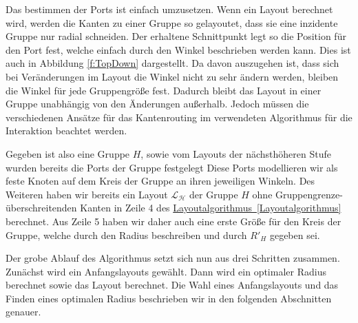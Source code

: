 Das bestimmen der Ports ist einfach umzusetzen. 
Wenn ein Layout berechnet wird, werden die Kanten zu einer Gruppe so gelayoutet, dass sie eine inzidente Gruppe nur radial schneiden.
Der erhaltene Schnittpunkt legt so die Position für den Port fest, welche einfach durch den Winkel beschrieben werden kann. 
Dies ist auch in Abbildung \autoref{f:TopDown} dargestellt.
Da davon auszugehen ist, dass sich bei Veränderungen im Layout die Winkel nicht zu sehr ändern werden, bleiben die Winkel für jede Gruppengröße fest.
Dadurch bleibt das Layout in einer Gruppe unabhängig von den Änderungen außerhalb. 
Jedoch müssen die verschiedenen Ansätze für das Kantenrouting im verwendeten Algorithmus für die Interaktion beachtet werden.



Gegeben ist also eine Gruppe $H$, sowie vom Layouts der nächsthöheren Stufe wurden bereits die Ports der Gruppe festgelegt
Diese Ports modellieren wir als feste Knoten auf dem Kreis der Gruppe an ihren jeweiligen Winkeln.
Des Weiteren haben wir bereits ein Layout $\mathcal{L_H}$ der Gruppe $H$ ohne Gruppengrenze-überschreitenden Kanten in Zeile 4 des \hyperref[Layoutalgorithmus]{Layoutalgorithmus~\ref*{Layoutalgorithmus}}  berechnet. 
Aus Zeile 5 haben wir daher auch eine erste Größe für den Kreis der Gruppe, welche durch den Radius beschreiben und durch $R'_H$ gegeben sei. 

Der grobe Ablauf des Algorithmus setzt sich nun aus drei Schritten zusammen. Zunächst wird ein Anfangslayouts gewählt.
Dann wird ein optimaler Radius  berechnet sowie das Layout berechnet. 
Die Wahl eines Anfangslayouts und das Finden eines optimalen Radius beschrieben wir in den folgenden Abschnitten genauer. 



